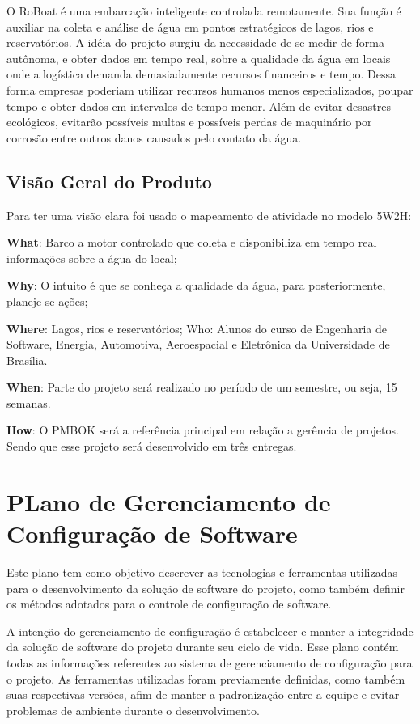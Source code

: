 O RoBoat é uma embarcação inteligente controlada remotamente. Sua função é auxiliar na coleta e análise de água em pontos estratégicos de lagos, rios e reservatórios. A idéia do projeto surgiu da necessidade de se medir de forma autônoma, e obter dados em tempo real, sobre a qualidade da água em locais onde a logística demanda demasiadamente recursos financeiros e tempo. Dessa forma empresas poderiam utilizar recursos humanos menos especializados, poupar tempo e obter dados em intervalos de tempo menor. Além de evitar desastres ecológicos, evitarão possíveis multas e possíveis perdas de maquinário por corrosão entre outros danos causados pelo contato da água.
      
\subsection{Visão Geral do Produto}

Para ter uma visão clara foi usado o mapeamento de atividade no modelo 5W2H:

\textbf{What}: Barco a motor controlado que coleta e disponibiliza em tempo real informações sobre a água do local;

\textbf{Why}: O intuito é que se conheça a qualidade da água, para posteriormente, planeje-se ações;

\textbf{Where}: Lagos, rios e reservatórios;
Who: Alunos do curso de Engenharia de Software, Energia, Automotiva, Aeroespacial e Eletrônica da Universidade de Brasília.

\textbf{When}: Parte do projeto será realizado no período de um semestre, ou seja, 15 semanas.

\textbf{How}: O PMBOK será a referência principal em relação a gerência de projetos. Sendo que esse projeto será desenvolvido em três entregas.

\section{PLano de Gerenciamento de Configuração de Software}


Este plano tem como objetivo descrever as tecnologias e ferramentas utilizadas para o desenvolvimento da solução de software do projeto, como também definir os métodos adotados para o controle de configuração de software.

A intenção do gerenciamento de configuração é estabelecer e manter a integridade da solução de software do projeto durante seu ciclo de vida.  Esse plano contém todas as informações referentes ao sistema de gerenciamento de configuração para o projeto. As ferramentas utilizadas foram previamente definidas, como também suas respectivas versões, afim de manter a padronização entre a equipe e evitar problemas de ambiente durante o desenvolvimento.

